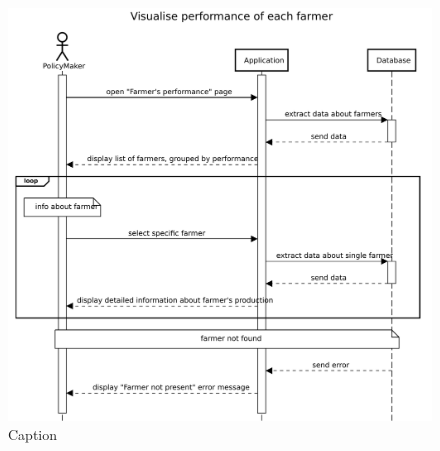 \begin{figure}[H]
    \centering
    \includegraphics[scale=0.5]{Images/Sequence diagrams/PolicyMaker - visualize performance.pdf}
    \caption{Caption}
    \label{fig:my_label}
\end{figure}

